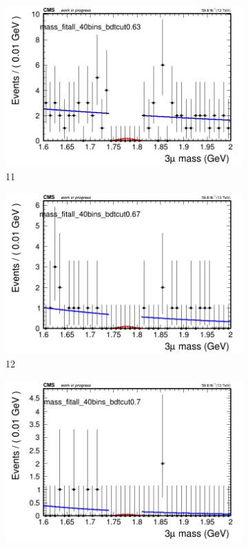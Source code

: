 \begin{figure}[h!]
\begin{subfigure}{0.2\textwidth}
        \includegraphics[width=\textwidth]{unfixed_exp/plots/all/massfit_all_40bins_bdtcut0.63.png}
        \caption{11}
    \end{subfigure}
    \begin{subfigure}{0.2\textwidth}
        \includegraphics[width=\textwidth]{unfixed_exp/plots/all/massfit_all_40bins_bdtcut0.67.png}
        \caption{12}
    \end{subfigure}
    \begin{subfigure}{0.2\textwidth}
        \includegraphics[width=\textwidth]{unfixed_exp/plots/all/massfit_all_40bins_bdtcut0.7.png}

\end{subfigure}
\end{figure}
